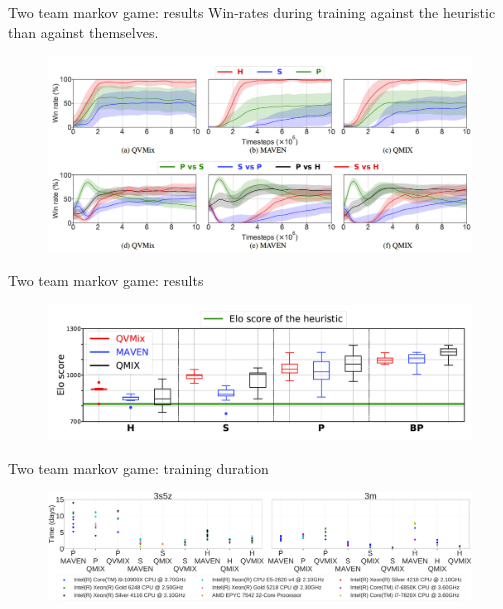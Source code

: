 \documentclass[9pt, hyperref={pdfusetitle,colorlinks=true,allcolors=DarkBlue}]{beamer}
\begin{document}
\begin{frame}{Two team markov game: results}
Win-rates during training against the heuristic than against themselves.
    \begin{figure}
        \centering
        \includegraphics[width=\textwidth]{2teams2.png}
    \end{figure}
\end{frame}
\begin{frame}{Two team markov game: results}
    \begin{figure}
        \centering
        \includegraphics[width=\textwidth]{2teams3.png}
    \end{figure}
\end{frame}
\begin{frame}{Two team markov game: training duration}

\begin{figure}
    \centering
    \includegraphics[width=\textwidth]{training_time.pdf}
\end{figure}
\end{frame}
\end{document}
